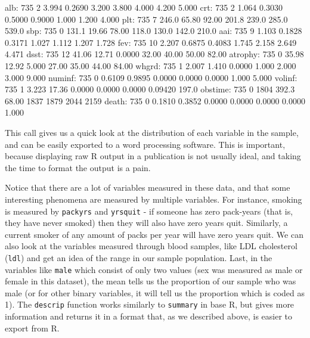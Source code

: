 \documentclass[landscape]{article}
\renewenvironment{Schunk}{\vspace{\topsep}}{\vspace{\topsep}}
\begin{document}
\begin{Schunk}
\begin{Soutput}
     alb:     735     2   3.994     0.2690    3.200     3.800     4.000     4.200      5.000  
     crt:     735     2   1.064     0.3030    0.5000    0.9000    1.000     1.200      4.000  
     plt:     735     7   246.0     65.80     92.00     201.8     239.0     285.0      539.0  
     sbp:     735     0   131.1     19.66     78.00     118.0     130.0     142.0      210.0  
     aai:     735     9   1.103     0.1828    0.3171    1.027     1.112     1.207      1.728  
     fev:     735    10   2.207     0.6875    0.4083    1.745     2.158     2.649      4.471  
    dsst:     735    12   41.06     12.71     0.0000    32.00     40.00     50.00      82.00  
 atrophy:     735     0   35.98     12.92     5.000     27.00     35.00     44.00      84.00  
   whgrd:     735     1   2.007     1.410     0.0000    1.000     2.000     3.000      9.000  
  numinf:     735     0   0.6109    0.9895    0.0000    0.0000    0.0000    1.000      5.000  
  volinf:     735     1   3.223     17.36     0.0000    0.0000    0.0000   0.09420     197.0  
 obstime:     735     0    1804     392.3     68.00      1837      1879      2044      2159   
   death:     735     0   0.1810    0.3852    0.0000    0.0000    0.0000    0.0000     1.000  
\end{Soutput}
\end{Schunk}

This call gives us a quick look at the distribution of each variable in the sample, and can be easily exported to a word processing software. This is important, because displaying raw R output in a publication is not usually ideal, and taking the time to format the output is a pain.

Notice that there are a lot of variables measured in these data, and that some interesting phenomena are measured by multiple variables. For instance, smoking is measured by \texttt{packyrs} and \texttt{yrsquit} - if someone has zero pack-years (that is, they have never smoked) then they will also have zero years quit. Similarly, a current smoker of any amount of packs per year will have zero years quit. We can also look at the variables measured through blood samples, like LDL cholesterol (\texttt{ldl}) and get an idea of the range in our sample population. Last, in the variables like \texttt{male} which consist of only two values (sex was measured as male or female in this dataset), the mean tells us the proportion of our sample who was male (or for other binary variables, it will tell us the proportion which is coded as 1). The \texttt{descrip} function works similarly to \texttt{summary} in base R, but gives more information and returns it in a format that, as we described above, is easier to export from R.
\end{document}
